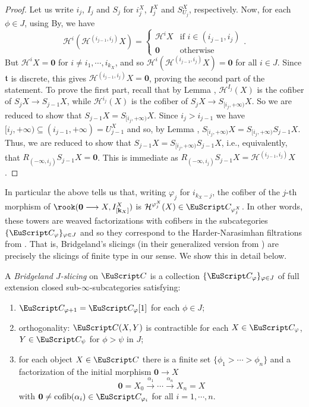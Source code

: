 \begin{proof}
Let us write $i_j$, $I_j$ and  $S_j$ for $i_j^X$, $I_j^X$ and  $S_{U_j}^X$, respectively.
Now, for each $\phi \in J$, using 
By, \aprop{} we have
\[
\mathcal{H}^{i}(\mathcal{H}^{(i_{j-1}, i_{j})}X)=
\begin{cases}
\mathcal{H}^{i}X &\text{if } i\in (i_{j-1},i_{j})\\
\mathbf{0} &\text{otherwise}
\end{cases}.
\]
 But $\mathcal{H}^iX=\mathbf{0}$ for $i \not = i_1 , \cdots , i_{k_X}$, and so $\mathcal{H}^{i}(\mathcal{H}^{(i_{j-1}, i_{j})}X)=\mathbf{0}$ for all $i \in J$. Since $\mathfrak{t}$ is discrete, this gives $\mathcal{H}^{(i_{j-1}, i_{j})}X= \mathbf{0}$, proving the second part of the statement. To prove the first part, recall that
by Lemma , $\mathcal{H}^{I_j}(X)$ is the cofiber of $S_{j}X\to S_{j-1}X$, while $\mathcal{H}^{i_j}(X)$ is the cofiber of $S_jX\to S_{[i_j,+\infty)}X$. So we are reduced to show that $S_{j-1}X=S_{[i_j,+\infty)}X$. Since $i_{j} > i_{j-1}$ we have $[i_{j},+\infty)\subseteq (i_{j-1},+\infty)=U_{j-1}^X$ and so, by Lemma , $S_{[i_j,+\infty)}X=S_{[i_j,+\infty)}S_{j-1}X$. Thus, we are reduced to show that $S_{j-1}X=S_{[i_j,+\infty)}S_{j-1}X$, i.e., equivalently, that $R_{(-\infty,i_j)}S_{j-1}X=\mathbf{0}$. This is immediate as $
R_{(-\infty,i_j)}S_{j-1}X=\mathcal{H}^{(i_{j-1}, i_j)}X$.
\end{proof}


In particular the above tells us that, writing $\varphi_j$ for $i_{k_X-j}$, the cofiber of the $j$-th morphism of $\rook(\mathbf{0} \to X,I_{[ \mathbf{k}_X ]}^X)$ is $\mathcal{H}^{\varphi_j^X}(X)\in \C_{\varphi_j^X}$. In other words, these towers are weaved factorizations with cofibers in the subcategories $\{ \C_{\varphi} \}_{\varphi \in J}$ and so they correspond to the Harder-Narasimhan filtrations from \cite{Brid}. That is,  Bridgeland's slicings (in their generalized version from \cite{GKR}) are precisely the slicings of finite type in our sense. We show this in detail below.


\begin{definition}\label{def.bridgeland-slicing}
A \textit{Bridgeland $J$-slicing} on $\C$ is a collection $\{\C_{\phi} \}_{\phi \in J}$ of full extension closed sub-$\infty$-subcategories satisfying:  
 \begin{enumerate}[label=$\roman*$)]
\item $\C_{\phi +1}=\C_{\phi}[1]$ for each $\phi \in J$;
\item orthogonality: $\C(X,Y)$ is contractible for each $X \in \C_{\phi}$, $Y \in \C_{\psi}$ for $\phi > \psi$ in $J$;
\item for each object $X \in \C$ there is a finite set $\{ \phi_1 > \cdots > \phi_n \}$ and a factorization of the initial morphism $\mathbf{0} \to X$
$$ \mathbf{0}=X_0 \xrightarrow{\alpha_1} \cdots \xrightarrow{\alpha_n} X_n=X$$
with $\mathbf{0} \neq \cofib(\alpha_i) \in \C_{\phi_i}$ for all $i = 1, \cdots, n$. 
 \end{enumerate}
\end{definition} 


